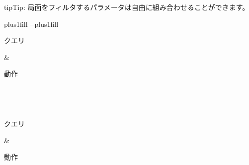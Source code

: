 \documentclass[letterpaper,10pt,dvipdfmx]{sphinxmanual}
\begin{document}
\begin{sphinxadmonition}{tip}{Tip:}
\sphinxAtStartPar
局面をフィルタするパラメータは自由に組み合わせることができます。
\end{sphinxadmonition}


\begin{savenotes}
\sphinxatlongtablestart
\sphinxthistablewithglobalstyle
\makeatletter
  \LTleft \@totalleftmargin plus1fill
  \LTright\dimexpr\columnwidth-\@totalleftmargin-\linewidth\relax plus1fill
\makeatother
\begin{longtable}{}
\sphinxtoprule
\begin{varwidth}[t]{}
\sphinxstyletheadfamily \sphinxAtStartPar
クエリ
\sphinxbeforeendvarwidth
\end{varwidth}%
&\begin{varwidth}[t]{}
\sphinxstyletheadfamily \sphinxAtStartPar
動作
\sphinxbeforeendvarwidth
\end{varwidth}%
\\
\sphinxmidrule
\endfirsthead

\\
\sphinxtoprule
\begin{varwidth}[t]{}
\sphinxstyletheadfamily \sphinxAtStartPar
クエリ
\sphinxbeforeendvarwidth
\end{varwidth}%
&\begin{varwidth}[t]{}
\sphinxstyletheadfamily \sphinxAtStartPar
動作
\sphinxbeforeendvarwidth
\end{varwidth}%
\\
\sphinxmidrule
\endhead

\sphinxbottomrule
{}\\
\endfoot


\end{longtable}
\end{savenotes}
\end{document}
